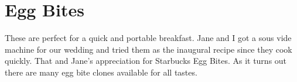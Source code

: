 \section[Egg Bites]{Egg Bites}

\begin{recipestats}[
        servings=12 jars,
        preptime=25 \minute,
        bakingtime=1 \hour,
        inactivetime=1 \hour,
        source=Mike \& Jane,
        original=\citetitle{anovaEggBites}~\cite{anovaEggBites},
    ]
\end{recipestats}

\begin{recipeabstract}
    These are perfect for a quick and portable breakfast.
    Jane and I got a sous vide machine for our wedding and tried them as the
    inaugural recipe since they cook quickly.
    That and Jane's appreciation for Starbucks Egg Bites.
    As it turns out there are many egg bite clones available for all tastes.
\end{recipeabstract}

\begin{ingredientcolumns}
    \begin{ingredientblock}
        \\
        \\
        \\
    \end{ingredientblock}
    \begin{ingredientblock}
        \\
        \\
        \\
    \end{ingredientblock}
\end{ingredientcolumns}

